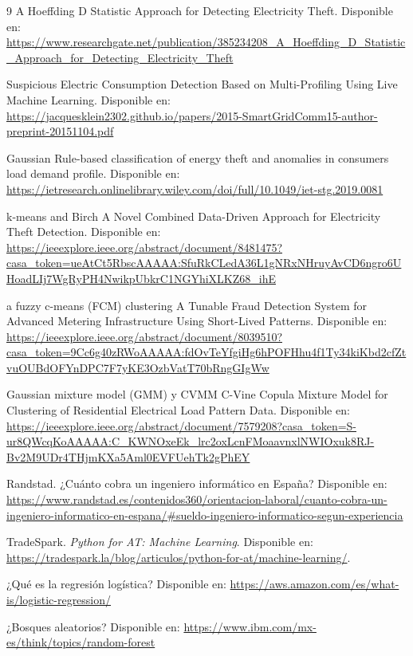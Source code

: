\documentclass[12pt,a4paper]{report}
\begin{document}
\begin{thebibliography}{9}
A Hoeffding D Statistic Approach for Detecting Electricity Theft. 
Disponible en: \url{https://www.researchgate.net/publication/385234208_A_Hoeffding_D_Statistic_Approach_for_Detecting_Electricity_Theft}

Suspicious Electric Consumption Detection Based on Multi-Profiling Using Live Machine Learning. 
Disponible en: \url{https://jacquesklein2302.github.io/papers/2015-SmartGridComm15-author-preprint-20151104.pdf}

 Gaussian
Rule-based classification of energy theft and anomalies in consumers load demand profile.
Disponible en: \url{https://ietresearch.onlinelibrary.wiley.com/doi/full/10.1049/iet-stg.2019.0081}

 k-means and Birch 
A Novel Combined Data-Driven Approach for Electricity Theft Detection.
Disponible en: \url{https://ieeexplore.ieee.org/abstract/document/8481475?casa_token=ueAtCt5RbscAAAAA:SfuRkCLedA36L1gNRxNHruyAvCD6ngro6UHoadLIj7WgRyPH4NwikpUbkrC1NGYhiXLKZ68_ihE}

 a fuzzy c-means (FCM) clustering
A Tunable Fraud Detection System for Advanced Metering Infrastructure Using Short-Lived Patterns.
Disponible en: \url{https://ieeexplore.ieee.org/abstract/document/8039510?casa_token=9Cc6g40zRWoAAAAA:fdOvTeYfgiHg6hPOFHhu4f1Ty34kiKbd2cfZtvuOUBdOFYnDPC7F7yKE3OzbVatT70bRngGIgWw}

 Gaussian mixture model (GMM) y  CVMM
C-Vine Copula Mixture Model for Clustering of Residential Electrical Load Pattern Data.
Disponible en: \url{https://ieeexplore.ieee.org/abstract/document/7579208?casa_token=S-ur8QWcqKoAAAAA:C_KWNOxeEk_lrc2oxLcnFMoaavnxlNWIOxuk8RJ-Bv2M9UDr4THjmKXa5Aml0EVFUehTk2gPhEY}

Randstad. 
¿Cuánto cobra un ingeniero informático en España? 
Disponible en: \url{https://www.randstad.es/contenidos360/orientacion-laboral/cuanto-cobra-un-ingeniero-informatico-en-espana/#sueldo-ingeniero-informatico-segun-experiencia}

TradeSpark. \textit{Python for AT: Machine Learning}. Disponible en: 
\url{https://tradespark.la/blog/articulos/python-for-at/machine-learning/}. 

¿Qué es la regresión logística?
Disponible en: \url{https://aws.amazon.com/es/what-is/logistic-regression/}

¿Bosques aleatorios?
Disponible en: \url{https://www.ibm.com/mx-es/think/topics/random-forest}


\end{thebibliography}
\end{document}

